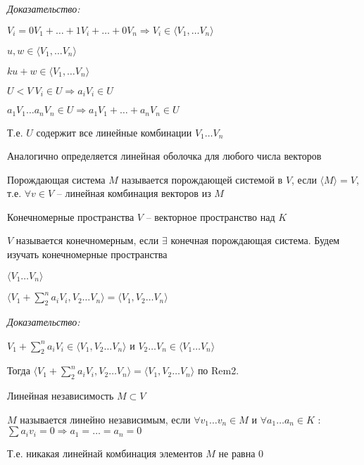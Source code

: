\documentclass[12pt]{article}
\newcommand{\q}[1]{\langle #1 \rangle}
\begin{document}
\textit{Доказательство:}

$V_i = 0 V_1 + \ldots + 1V_i + \ldots + 0V_n \Rightarrow V_i \in \langle V_1, \ldots V_n \rangle$

$u, w \in \langle V_1, \ldots V_n \rangle$

$ku + w \in \langle V_1, \ldots V_n \rangle$

\vspace{2mm}

$U < V\ V_i \in U \Rightarrow a_iV_i \in U$

$a_1V_1 \ldots a_nV_n \in U \Rightarrow a_1V_1 + \ldots + a_nV_n \in U$

Т.е. $U$ содержит все линейные комбинации $V_1 \ldots V_n$

\begin{Remark}{}
    Аналогично определяется линейная оболочка для любого числа векторов
\end{Remark}

\begin{defin}{Порождающая система}
    $M$ называется порождающей системой в $V$, если $\langle M \rangle = V$, т.е. $\forall v \in V$ -- линейная комбинация векторов из $M$
\end{defin}

\begin{defin}{Конечномерные пространства}
    $V$ -- векторное пространство над $K$

    $V$ называется конечномерным, если $\exists$ конечная порождающая система. Будем изучать конечномерные пространства
\end{defin}

\begin{lem}{}
    $\q{V_1 \ldots V_n}$

    $\q{V_1 + \sum\limits_2^n a_iV_i, V_2 \ldots V_n} = \q{V_1, V_2 \ldots V_n}$
\end{lem}

\textit{Доказательство:}

$V_1 + \sum\limits_2^n a_iV_i \in \q{V_1, V_2 \ldots V_n}$ и $V_2 \ldots V_n \in \q{V_1 \ldots V_n}$

Тогда $\q{V_1 + \sum\limits_2^n a_iV_i, V_2 \ldots V_n} = \q{V_1, V_2 \ldots V_n}$ по Rem2.

\begin{defin}{Линейная независимость}
    $M \subset V$

    $M$ называется линейно независимым, если $\forall v_1 \ldots v_n \in M$ и $\forall a_1 \ldots a_n \in K$ : $\sum a_iv_i = 0 \Rightarrow a_1 = \ldots = a_n = 0$

    Т.е. никакая линейнай комбинация элементов $M$ не равна 0
\end{defin}
\end{document}
